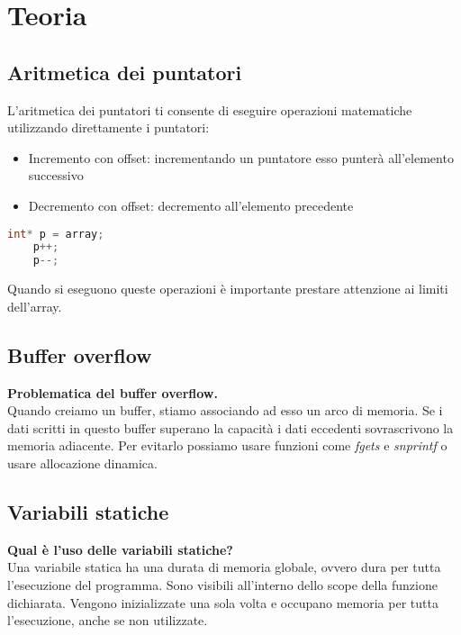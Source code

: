 \newpage
\section{Teoria}
\subsection{Aritmetica dei puntatori}
L'aritmetica dei puntatori ti consente di eseguire operazioni matematiche utilizzando direttamente i puntatori:
\begin{itemize}
	\item Incremento con offset: incrementando un puntatore esso punterà all'elemento successivo
	\item Decremento con offset: decremento all'elemento precedente
\end{itemize}
\begin{lstlisting}[language=C]
	int* p = array;
	p++;
	p--;
\end{lstlisting}
\begin{note}
	Quando si eseguono queste operazioni è importante prestare attenzione ai limiti dell'array.
\end{note}
\subsection{Buffer overflow}
\textbf{Problematica del buffer overflow.}\\
Quando creiamo un buffer, stiamo associando ad esso un arco di memoria. Se i dati scritti in questo buffer superano la capacità i dati eccedenti sovrascrivono la memoria adiacente. Per evitarlo possiamo usare funzioni come \textit{fgets} e \textit{snprintf} o usare allocazione dinamica.

\subsection{Variabili statiche}
\textbf{Qual è l'uso delle variabili statiche?}\\
Una variabile statica ha una durata di memoria globale, ovvero dura per tutta l'esecuzione del programma. Sono visibili all'interno dello scope della funzione dichiarata. Vengono inizializzate una sola volta e occupano memoria per tutta l'esecuzione, anche se non utilizzate.

